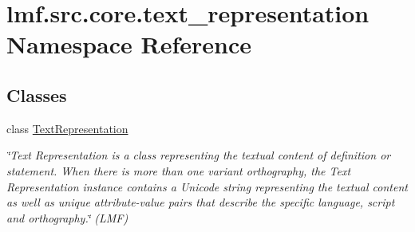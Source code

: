 \hypertarget{namespacelmf_1_1src_1_1core_1_1text__representation}{\section{lmf.\+src.\+core.\+text\+\_\+representation Namespace Reference}
\label{namespacelmf_1_1src_1_1core_1_1text__representation}
}
\subsection*{Classes}
\begin{DoxyCompactItemize}
\item 
class \hyperlink{classlmf_1_1src_1_1core_1_1text__representation_1_1_text_representation}{Text\+Representation}
\begin{DoxyCompactList}\small\item\em \char`\"{}\+Text Representation is a class representing the textual content of definition or statement. When there is more than one variant orthography, the Text Representation instance contains a Unicode string representing the textual content as well as unique attribute-\/value pairs that describe the specific language, script and orthography.\char`\"{} (L\+M\+F) \end{DoxyCompactList}\end{DoxyCompactItemize}
